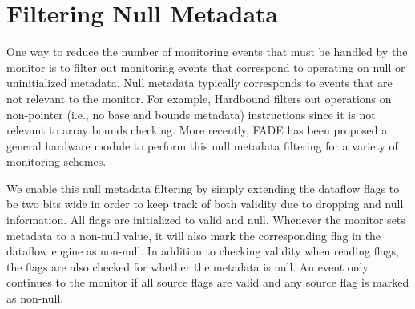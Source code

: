 \section{Filtering Null Metadata}
\label{sec:filtering}

One way to reduce the number of monitoring events that must be handled by the
monitor is to filter out monitoring events that correspond to operating on null
or uninitialized metadata. Null metadata typically corresponds to events that
are not relevant to the monitor. For example, Hardbound
\cite{hardbound-asplos08} filters out operations on non-pointer (i.e., no base
and bounds metadata) instructions since it is not relevant to array bounds
checking. More recently, FADE \cite{fade-hpca14} has been proposed a general
hardware module to perform this null metadata filtering for a variety of
monitoring schemes. 

We enable this null metadata filtering by
simply extending the dataflow flags to be two bits wide in order to keep track
of both validity due to dropping and null information.
All flags are initialized to valid and null. Whenever the monitor sets metadata
to a non-null value, it will also mark the corresponding flag in the dataflow
engine as non-null. In addition to checking validity when reading flags, the
flags are also checked for whether the metadata is null. An event only
continues to the monitor if all source flags are valid and any source flag is
marked as non-null.

